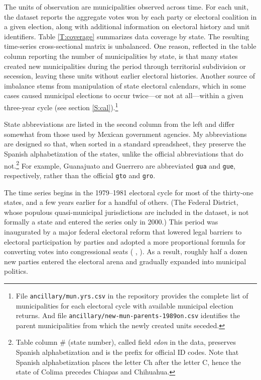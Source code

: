 \documentclass[letter,12pt]{article}
\begin{document}
The units of observation are municipalities observed across time. For each unit, the dataset reports the aggregate votes won by each party or electoral coalition in a given election, along with additional information on electoral history and unit identifiers. Table \ref{T:coverage} summarizes data coverage by state. The resulting time-series cross-sectional matrix is unbalanced. One reason, reflected in the table column reporting the number of municipalities by state, is that many states created new municipalities during the period through territorial subdivision or secession, leaving these units without earlier electoral histories. Another source of imbalance stems from manipulation of state electoral calendars, which in some cases caused municipal elections to occur twice---or not at all---within a given three-year cycle (see section \ref{S:cal}).\footnote{File \verb|ancillary/mun.yrs.csv| in the repository provides the complete list of municipalities for each electoral cycle with available municipal election returns. And file \verb|ancillary/new-mun-parents-1989on.csv| identifies the parent municipalities from which the newly created units seceded.}

State abbreviations are listed in the second column from the left and differ somewhat from those used by Mexican government agencies. My abbreviations are designed so that, when sorted in a standard spreadsheet, they preserve the Spanish alphabetization of the states, unlike the official abbreviations that do not.\footnote{Table column \# (state number), called field \emph{edon} in the data, preserves Spanish alphabetization and is the prefix for official ID codes. Note that Spanish alphabetization places the letter Ch after the letter C, hence the state of Colima precedes Chiapas and Chihuahua.} For example, Guanajuato and Guerrero are abbreviated \verb|gua| and \verb|gue|, respectively, rather than the official \verb|gto| and \verb|gro|.

The time series begins in the 1979--1981 electoral cycle for most of the thirty-one states, and a few years earlier for a handful of others. (The Federal District, whose populous quasi-municipal jurisdictions are included in the dataset, is not formally a state and entered the series only in 2000.) This period was inaugurated by a major federal electoral reform that lowered legal barriers to electoral participation by parties and adopted a more proportional formula for converting votes into congressional seats (\citeauthor{molinar.1991a} \citeyear[:116]{molinar.1991a}, \citeauthor{weldonMixedMemberSys2001} \citeyear{weldonMixedMemberSys2001}). As a result, roughly half a dozen new parties entered the electoral arena and gradually expanded into municipal politics.  
\end{document}
